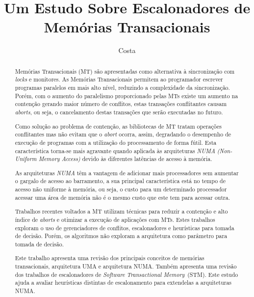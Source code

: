 \documentclass[ti]{texufpel}
\title{Um Estudo Sobre Escalonadores de Memórias Transacionais}
\author{Costa}{Michael Alexandre}
\begin{document}
\maketitle

\sloppy

\begin{abstract}

Memórias Transacionais (MT) são apresentadas como alternativa à sincronização com \emph{locks} e monitores. As Memórias Transacionais permitem ao programador escrever programas paralelos em mais alto nível, reduzindo a complexidade da sincronização. Porém, com o aumento do paralelismo proporcionado pelas MTs existe um aumento na contenção gerando maior número de conflitos, estas transações conflitantes causam \emph{aborts}, ou seja, o cancelamento destas transações que serão executadas no futuro.

Como solução ao problema de contenção, as bibliotecas de MT tratam operações conflitantes mas não evitam que o \emph{abort} ocorra, assim, degradando o desempenho de execução de programas com a utilização do processamento de forma fútil. Esta característica torna-se mais agravante quando aplicada às arquiteturas \emph{NUMA} \emph{(Non-Uniform Memory Access)} devido às diferentes latências de acesso à memória.

As arquiteturas \emph{NUMA} têm a vantagem de adicionar mais processadores sem aumentar o gargalo de acesso ao barramento, a sua principal característica está no tempo de acesso não uniforme à memória, ou seja, o custo para um determinado processador acessar uma área de memória não é o mesmo custo que este tem para acessar outra.

Trabalhos recentes voltados a MT utilizam técnicas para reduzir a contenção e alto índice de \emph{aborts} e otimizar a execução de aplicações com MTs. Estes trabalhos exploram o uso de gerenciadores de conflitos, escalonadores e heurísticas para tomada de decisão. Porém, os algoritmos não exploram a arquitetura como parâmetro para tomada de decisão.

Este trabalho apresenta uma revisão dos principais conceitos de memórias transacionais, arquitetura UMA e arquitetura NUMA. Também apresenta uma revisão dos trabalhos de escalonadores de \emph{Software Transactional Memory}~(STM). Este estudo ajuda a avaliar heurísticas distintas de escalonamento para extendelas a arquiteturas NUMA.

\end{abstract}
\end{document}
